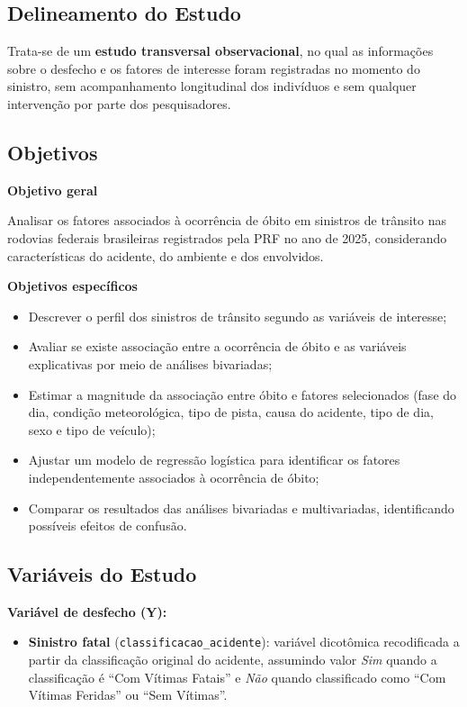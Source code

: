 \documentclass[
  brazilian,
  12pt,
]{article}
\providecommand{\tightlist}{%
  \setlength{\itemsep}{0pt}\setlength{\parskip}{0pt}}
\begin{document}
\subsection{Delineamento do Estudo}\label{delineamento-do-estudo}

Trata-se de um \textbf{estudo transversal observacional}, no qual as
informações sobre o desfecho e os fatores de interesse foram registradas
no momento do sinistro, sem acompanhamento longitudinal dos indivíduos e
sem qualquer intervenção por parte dos pesquisadores.

\subsection{Objetivos}\label{objetivos}

\textbf{Objetivo geral}

Analisar os fatores associados à ocorrência de óbito em sinistros de
trânsito nas rodovias federais brasileiras registrados pela PRF no ano
de 2025, considerando características do acidente, do ambiente e dos
envolvidos.

\textbf{Objetivos específicos}

\begin{itemize}
\item
  Descrever o perfil dos sinistros de trânsito segundo as variáveis de
  interesse;
\item
  Avaliar se existe associação entre a ocorrência de óbito e as
  variáveis explicativas por meio de análises bivariadas;
\item
  Estimar a magnitude da associação entre óbito e fatores selecionados
  (fase do dia, condição meteorológica, tipo de pista, causa do
  acidente, tipo de dia, sexo e tipo de veículo);
\item
  Ajustar um modelo de regressão logística para identificar os fatores
  independentemente associados à ocorrência de óbito;
\item
  Comparar os resultados das análises bivariadas e multivariadas,
  identificando possíveis efeitos de confusão.
\end{itemize}

\subsection{Variáveis do Estudo}\label{variuxe1veis-do-estudo}

\textbf{Variável de desfecho (Y):}

\begin{itemize}
\tightlist
\item
  \textbf{Sinistro fatal} (\texttt{classificacao\_acidente}): variável
  dicotômica recodificada a partir da classificação original do
  acidente, assumindo valor \emph{Sim} quando a classificação é ``Com
  Vítimas Fatais'' e \emph{Não} quando classificado como ``Com Vítimas
  Feridas'' ou ``Sem Vítimas''.
\end{itemize}
\end{document}
